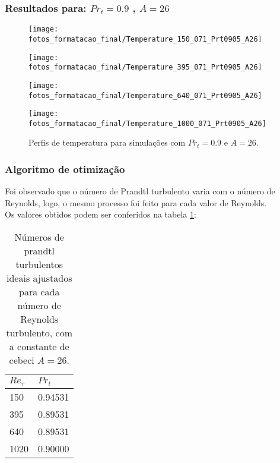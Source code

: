 \documentclass[xcolor=dvipsnames,10pt,aspectratio=169]{beamer}
\begin{document}
		\begin{frame}
		\frametitle{Resultados para: $Pr_t = 0.9$ , $A = 26$}
      \begin{figure}[!h]
        \centering
        \begin{minipage}[t]{0.49\textwidth}
          \centering
          \texttt{[image: fotos\_formatacao\_final/Temperature\_150\_071\_Prt0905\_A26]}
          \caption{$Re_\tau = 150$, $L2_t = 0.34$}
        \end{minipage}
        \begin{minipage}[t]{0.49\textwidth}
          \centering
          \texttt{[image: fotos\_formatacao\_final/Temperature\_395\_071\_Prt0905\_A26]}
          \caption{$Re_\tau = 395$, $L2_t = 0.23$}
        \end{minipage}
        \begin{minipage}[t]{0.49\textwidth}
          \centering
          \texttt{[image: fotos\_formatacao\_final/Temperature\_640\_071\_Prt0905\_A26]}
          \caption{$Re_\tau = 640$, $L2_t = 0.19$}
        \end{minipage}
        \begin{minipage}[t]{0.49\textwidth}
          \centering
          \texttt{[image: fotos\_formatacao\_final/Temperature\_1000\_071\_Prt0905\_A26]}
          \caption{$Re_\tau = 1020$, $L2_t = 0.14$}
        \end{minipage}	
        \caption{Perfis de temperatura para simulações com $Pr_t = 0.9 $ e $A = 26$.}
        \label{primeiros}
      \end{figure}
		\end{frame}	
	
	
	
	
		
		\begin{frame}
		\frametitle{Algoritmo de otimização}
    Foi observado que o número de Prandtl turbulento varia com o número de Reynolds, logo, o mesmo processo foi feito para cada valor de Reynolds.\\

      Os valores obtidos podem ser conferidos na tabela \ref{tabela1}:

      \begin{table}[!h]
        \centering
        \caption{Números de prandtl turbulentos ideais ajustados para cada número de Reynolds turbulento, com a constante de cebeci $A = 26$.}
        \begin{tabular}{ll}
            \hline
            $Re_\tau$ & $Pr_t$\\
            \hline
            150  &   0.94531\\
            395  &   0.89531\\
            640  &   0.89531\\
            1020 &   0.90000\\ 
            \hline
        \end{tabular}
        \label{tabela1}
      \end{table}
		\end{frame}	
	
\end{document}
